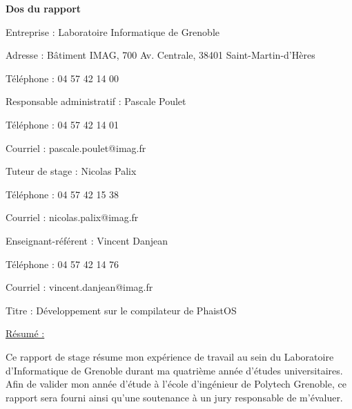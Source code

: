 \newpage



\begin{titlepage}
    \begin{center}
    \LARGE \textbf{Dos du rapport}
    \vspace{0.7cm}
    \end{center}
    \par
    \raisebox{-.5\height}{Étudiant : Victor Malod}
    \hfill
    \raisebox{-.5\height}{Année d'étude dans la spécialité : INFO 4}
    
    \vspace{1cm}
    \par {Entreprise : Laboratoire Informatique de Grenoble}
    \par {Adresse : Bâtiment IMAG, 700 Av. Centrale, 38401 Saint-Martin-d'Hères}
    \par {Téléphone : 04 57 42 14 00}

    \vspace{1cm}
    \par {Responsable administratif : Pascale Poulet}
    \par {Téléphone : 04 57 42 14 01}
    \par {Courriel : pascale.poulet@imag.fr}

    \vspace{1cm}
    \par {Tuteur de stage : Nicolas Palix}
    \par {Téléphone : 04 57 42 15 38}
    \par {Courriel : nicolas.palix@imag.fr}

    \vspace{1cm}
    \par {Enseignant-référent : Vincent Danjean }
    \par {Téléphone : 04 57 42 14 76}
    \par {Courriel : vincent.danjean@imag.fr}

    \vspace{1cm}
    \par {Titre : \large Développement sur le compilateur de PhaistOS }

    \vspace{1cm}
\par {\underline{Résumé :}

Ce rapport de stage résume mon expérience de travail au sein du Laboratoire 
d'Informatique de Grenoble durant ma quatrième année d'études universitaires. 
Afin de valider mon année d'étude à l'école d'ingénieur de Polytech Grenoble, 
ce rapport sera fourni ainsi qu'une soutenance à un jury responsable de 
m'évaluer. 

}
\end{titlepage}
